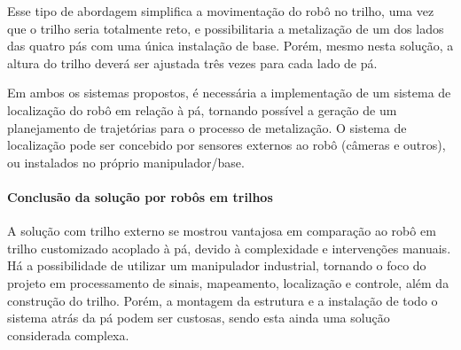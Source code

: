 Esse tipo de abordagem simplifica a movimentação do robô no
trilho, uma vez que o trilho seria totalmente reto, e possibilitaria a
metalização de um dos lados das quatro pás com uma única instalação de base.
Porém, mesmo nesta solução, a altura do trilho deverá ser ajustada três vezes para
cada lado de pá.

Em ambos os sistemas propostos, é necessária a implementação de um sistema de
localização do robô em relação à pá, tornando possível a geração de um
planejamento de trajetórias para o processo de metalização. O sistema de
localização pode ser concebido por sensores externos
ao robô (câmeras e outros), ou instalados no próprio manipulador/base.

\paragraph{Conclusão da solução por robôs em trilhos}

A solução com trilho externo se mostrou vantajosa em comparação ao robô em
trilho customizado acoplado à pá, devido à complexidade e intervenções
manuais. Há a possibilidade de utilizar um manipulador industrial, tornando o
foco do projeto em processamento de sinais, mapeamento, localização e controle,
além da construção do trilho. Porém, a montagem da estrutura e a instalação de
todo o sistema atrás da pá podem ser custosas, sendo esta ainda uma solução
considerada complexa.